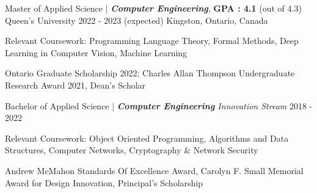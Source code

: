 

\begin{cventries}

  \cventry
    {Master of Applied Science | \textit{\textbf{Computer Engineering}}, \textbf{GPA : 4.1} (out of 4.3)} %
    {Queen's University} %
    {2022 - 2023 (expected)} %
    {Kingston, Ontario, Canada} %
    {
    \begin{cvitems} %
        \item {Relevant Coursework: Programming Language Theory, Formal Methods, Deep Learning in Computer Vision, Machine Learning}
        \item{Ontario Graduate Scholarship 2022; Charles Allan Thompson Undergraduate Research Award 2021, Dean's Scholar}
      \end{cvitems}
    }
  \cventry
    {Bachelor of Applied Science | \textit{\textbf{Computer Engineering} Innovation Stream}} %
    {} %
    {2018 - 2022} %
    {} %
    {
    \begin{cvitems} %
        \item {Relevant Coursework: Object Oriented Programming, Algorithms and Data Structures, Computer Networks, Cryptography \& Network Security} %
        \item{Andrew McMahon Standards Of Excellence Award, Carolyn F. Small Memorial Award for Design Innovation, Principal's Scholarship}
      \end{cvitems}
    }
    \cventry{}{}{}{}{}
\end{cventries}
